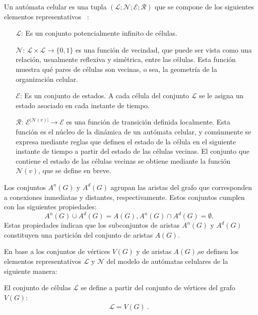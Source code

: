 Un aut\'omata celular es una tupla $(\mathcal{L}; \mathcal{N}; \mathcal{E}; \mathcal{R})$ que se compone de los siguientes elementos representativos ~\cite{2}:
\begin{itemize}
\item [$\mathcal{L}$:] Es un conjunto potencialmente infinito de c\'elulas.
\item [$\mathcal{N}$:] $\mathcal{L} \times \mathcal{L} \rightarrow \lbrace 0,1 \rbrace$ es una funci\'on de vecindad, que puede ser vista como una relaci\'on, usualmente reflexiva y sim\'etrica, entre las c\'elulas. Esta funci\'on muestra qu\'e pares de c\'elulas son vecinas, o sea, la geometr\'ia de la organizaci\'on celular.
\item [$\mathcal{E}$:]  Es un conjunto de estados. A cada c\'elula del conjunto $\mathcal{L}$ se le asigna un estado asociado en cada instante de tiempo.
\item [$\mathcal{R}$:] $\mathcal{E}^{|\mathcal{N}(v)|} \rightarrow \mathcal{E}$ es una funci\'on de transici\'on definida localmente. Esta funci\'on es el n\'ucleo de la din\'amica de un aut\'omata celular, y com\'unmente se expresa mediante reglas que definen el estado de la c\'elula en el siguiente instante de tiempo a partir del estado de las c\'elulas vecinas. El conjunto que contiene el estado de las c\'elulas vecinas se obtiene mediante la funci\'on $\mathcal{N}(v)$, que se define en breve.
\end{itemize}

Los conjuntos $A^n(G)$ y $A^d(G)$ agrupan las aristas del grafo que corresponden a conexiones inmediatas y distantes, respectivamente. Estos conjuntos cumplen con las siguientes propiedades:
\begin{subequations}
\begin{equation}
A^n(G) \cup A^d(G) = A(G),
\end{equation}
\begin{equation}
A^n(G) \cap A^d(G) = \emptyset.
\end{equation}
\end{subequations}
Estas propiedades indican que los subconjuntos de aristas $A^n(G)$ y $A^d(G)$ constituyen una partición del conjunto de aristas $A(G)$.

En base a los conjuntos de vértices $V(G)$ y de aristas $A(G)$,se definen los elementos representativos $\mathcal{L}$ y $\mathcal{N}$ del modelo de autómatas celulares de la siguiente manera:

El conjunto de c\'elulas $\mathcal{L}$ se define a partir del conjunto de v\'ertices del grafo  $V(G)$:
\begin{align}
\boxed{\mathcal{L} = V(G)}~. \label{eq-L}
\end{align}


